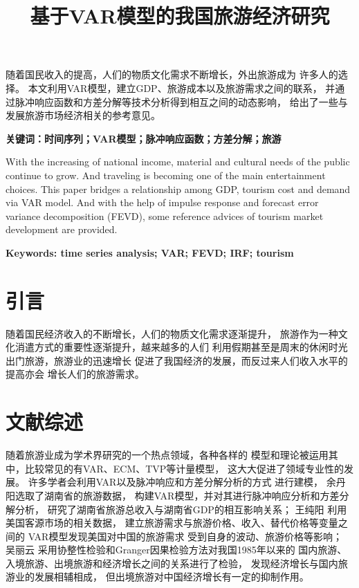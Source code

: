 \documentclass{article}
\title{基于VAR模型的我国旅游经济研究}
\date{}
\def\keywords#1{\noindent\textbf{关键词：#1}}
\def\keywordsEn#1{\noindent\textbf{Keywords: #1}}
\begin{document}
    \maketitle    

    \begin{abstractZH}
        随着国民收入的提高，人们的物质文化需求不断增长，外出旅游成为
        许多人的选择。
        本文利用VAR模型，建立GDP、旅游成本以及旅游需求之间的联系，
        并通过脉冲响应函数和方差分解等技术分析得到相互之间的动态影响，
        给出了一些与发展旅游市场经济相关的参考意见。

        \keywords{时间序列；VAR模型；脉冲响应函数；方差分解；旅游}

    \end{abstractZH}

    \newpage
    \setcounter{page}{1}
    \begin{abstractEN}
        With the increasing of national income, 
        material and cultural needs of the public
        continue to grow. And traveling is becoming one
        of the main entertainment choices.
        This paper bridges a relationship among GDP, tourism cost and
        demand via VAR model. And with the help of impulse response
        and forecast error variance decomposition (FEVD), some
        reference advices of tourism market development are provided.

        \keywordsEn{time series analysis; VAR; FEVD; IRF; tourism}
    \end{abstractEN}


    \newpage
    \tableofcontents

    \newpage
    \setcounter{page}{1}
    \section{引言}
    随着国民经济收入的不断增长，人们的物质文化需求逐渐提升，
    旅游作为一种文化消遣方式的重要性逐渐提升，越来越多的人们
    利用假期甚至是周末的休闲时光出门旅游，旅游业的迅速增长
    促进了我国经济的发展，而反过来人们收入水平的提高亦会
    增长人们的旅游需求。

    \section{文献综述}
    随着旅游业成为学术界研究的一个热点领域，各种各样的
    模型和理论被运用其中，比较常见的有VAR、ECM、TVP等计量模型，
    这大大促进了领域专业性的发展\cite{song2006forecasting}。
    许多学者会利用VAR以及脉冲响应和方差分解分析的方式
    进行建模，
    余丹阳\cite{余丹阳2018基于}选取了湖南省的旅游数据，
    构建VAR模型，并对其进行脉冲响应分析和方差分解分析，
    研究了湖南省旅游总收入与湖南省GDP的相互影响关系；
    王纯阳\cite{王纯阳2010基于}
    利用美国客源市场的相关数据，
    建立旅游需求与旅游价格、收入、替代价格等变量之间的
    VAR模型发现美国对中国的旅游需求
    受到自身的波动、旅游价格等影响；
    吴丽云\cite{吴丽云2010我国旅游业与经济增长的关系分析}
    采用协整性检验和Granger因果检验方法对我国1985年以来的
    国内旅游、入境旅游、出境旅游和经济增长之间的关系进行了检验，
    发现经济增长与国内旅游业的发展相辅相成，
    但出境旅游对中国经济增长有一定的抑制作用。
\end{document}
